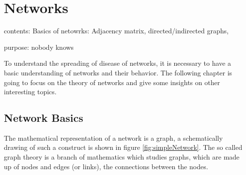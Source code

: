 \section{Networks}\label{chap:networksBasics}
contents: Basics of netowrks: Adjacency matrix, directed/indirected graphs, 

purpose: nobody knows


To understand the spreading of disease of networks, it is necessary to have a basic understanding of networks and their behavior. The following chapter is going to focus on the theory of networks and give some insights on other interesting topics.
\subsection{Network Basics}
The mathematical representation of a network is a graph, a schematically drawing of such a construct is shown in figure \ref{fig:simpleNetwork}. The so called graph theory is a branch of mathematics which studies graphs, which are made up of nodes and edges (or links), the connections between the nodes.

